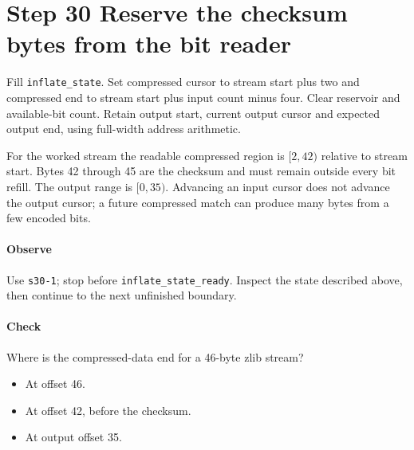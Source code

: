 \section{Step 30 Reserve the checksum bytes from the bit reader}\label{png-inflate-s30}
Fill \texttt{inflate\_state}. Set compressed cursor to stream start plus two and compressed end to stream start plus input count minus four. Clear reservoir and available-bit count. Retain output start, current output cursor and expected output end, using full-width address arithmetic.

For the worked stream the readable compressed region is $[2,42)$ relative to stream start. Bytes 42 through 45 are the checksum and must remain outside every bit refill. The output range is $[0,35)$. Advancing an input cursor does not advance the output cursor; a future compressed match can produce many bytes from a few encoded bits.

\paragraph{Observe} Use \texttt{s30-1}; stop before \texttt{inflate\_state\_ready}. Inspect the state described above, then continue to the next unfinished boundary.

\paragraph{Check} Where is the compressed-data end for a 46-byte zlib stream?
\begin{itemize}
\item[A.] At offset 46.
\item[B.] At offset 42, before the checksum.
\item[C.] At output offset 35.
\end{itemize}
